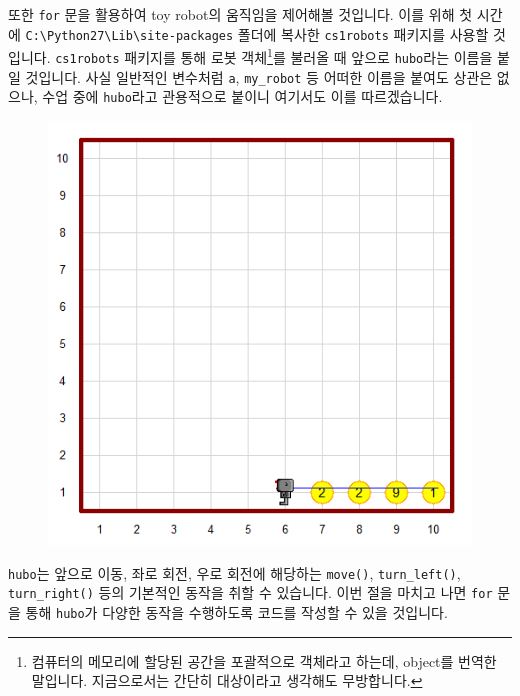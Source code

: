 \documentclass[../main.tex]{subfiles}
\begin{document}
또한 \texttt{for} 문을 활용하여 toy robot의 움직임을 제어해볼 것입니다.
이를 위해 첫 시간에 \texttt{C:\textbackslash Python27\textbackslash Lib\textbackslash site-packages} 폴더에 복사한 \texttt{cs1robots} 패키지를 사용할 것입니다.
\texttt{cs1robots} 패키지를 통해 로봇 객체\footnote{컴퓨터의 메모리에 할당된 공간을 포괄적으로 객체라고 하는데, object를 번역한 말입니다. 지금으로서는 간단히 대상이라고 생각해도 무방합니다.}를 불러올 때 앞으로 \texttt{hubo}라는 이름을 붙일 것입니다.
사실 일반적인 변수처럼 \texttt{a}, \texttt{my\_robot} 등 어떠한 이름을 붙여도 상관은 없으나, 수업 중에 \texttt{hubo}라고 관용적으로 붙이니 여기서도 이를 따르겠습니다.
\begin{figure}[H]
\centering
\includegraphics[width=0.5\linewidth]{"./lectures/lecture4_example"}
\label{fig:lecture4example}
\end{figure}
\texttt{hubo}는 앞으로 이동, 좌로 회전, 우로 회전에 해당하는 \texttt{move()}, \texttt{turn\_left()}, \texttt{turn\_right()} 등의 기본적인 동작을 취할 수 있습니다.
이번 절을 마치고 나면 \texttt{for} 문을 통해 \texttt{hubo}가 다양한 동작을 수행하도록 코드를 작성할 수 있을 것입니다.
\end{document}

